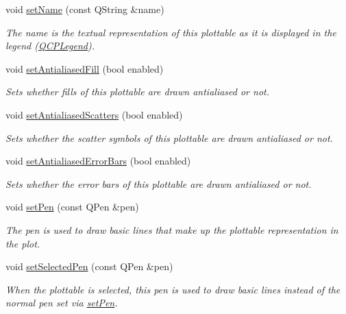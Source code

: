 \begin{DoxyCompactItemize}
\item 
void \hyperlink{classQCPAbstractPlottable_ab79c7ba76bc7fa89a4b3580e12149f1f}{set\+Name} (const Q\+String \&name)
\begin{DoxyCompactList}\small\item\em The name is the textual representation of this plottable as it is displayed in the legend (\hyperlink{classQCPLegend}{Q\+C\+P\+Legend}). \end{DoxyCompactList}\item 
void \hyperlink{classQCPAbstractPlottable_a089d6b5577120239b55c39ed27c39536}{set\+Antialiased\+Fill} (bool enabled)
\begin{DoxyCompactList}\small\item\em Sets whether fills of this plottable are drawn antialiased or not. \end{DoxyCompactList}\item 
void \hyperlink{classQCPAbstractPlottable_a2f03f067ede2ed4da6f7d0e4777a3f02}{set\+Antialiased\+Scatters} (bool enabled)
\begin{DoxyCompactList}\small\item\em Sets whether the scatter symbols of this plottable are drawn antialiased or not. \end{DoxyCompactList}\item 
void \hyperlink{classQCPAbstractPlottable_a757beb744b96cf1855cca5ab9d3ecf52}{set\+Antialiased\+Error\+Bars} (bool enabled)
\begin{DoxyCompactList}\small\item\em Sets whether the error bars of this plottable are drawn antialiased or not. \end{DoxyCompactList}\item 
void \hyperlink{classQCPAbstractPlottable_ab74b09ae4c0e7e13142fe4b5bf46cac7}{set\+Pen} (const Q\+Pen \&pen)
\begin{DoxyCompactList}\small\item\em The pen is used to draw basic lines that make up the plottable representation in the plot. \end{DoxyCompactList}\item 
void \hyperlink{classQCPAbstractPlottable_a6911603cad23ab0469b108224517516f}{set\+Selected\+Pen} (const Q\+Pen \&pen)
\begin{DoxyCompactList}\small\item\em When the plottable is selected, this pen is used to draw basic lines instead of the normal pen set via \hyperlink{classQCPAbstractPlottable_ab74b09ae4c0e7e13142fe4b5bf46cac7}{set\+Pen}. \end{DoxyCompactList}\item 

\end{DoxyCompactItemize}

